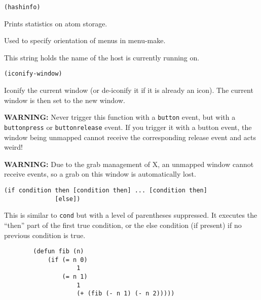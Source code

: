         
{\usagefont\begin{verbatim}
(hashinfo)
\end{verbatim}}\usageupspace

Prints statistics on atom storage.

        

Used to specify orientation of menus in menu-make.



This string holds the name of the host {\GWM} is currently running on.

        
{\usagefont\begin{verbatim}
(iconify-window)
\end{verbatim}}\usageupspace

Iconify the current window (or de-iconify it if it is already an icon). The
current window is then set to the new window. 

{\bf WARNING:} Never trigger this function with a \verb"button" event, but
with a \verb"buttonpress" or \verb"buttonrelease" event. If you trigger it
with a button event, the window being unmapped cannot receive the
corresponding release event and {\GWM} acts weird!

{\bf WARNING:} Due to the grab management of X, an unmapped window cannot
receive events, so a grab on this window is automatically lost.

        
{\usagefont\begin{verbatim}
(if condition then [condition then] ... [condition then]
              [else])
\end{verbatim}}\usageupspace

This is similar to \verb"cond" but with a level of parentheses suppressed.  It
executes the ``then'' part of the first true condition, or the else condition
(if present) if no previous condition is true.

{\exemplefont\begin{verbatim}
        (defun fib (n)
            (if (= n 0)
                    1
                (= n 1) 
                    1
                    (+ (fib (- n 1) (- n 2)))))
\end{verbatim}}

